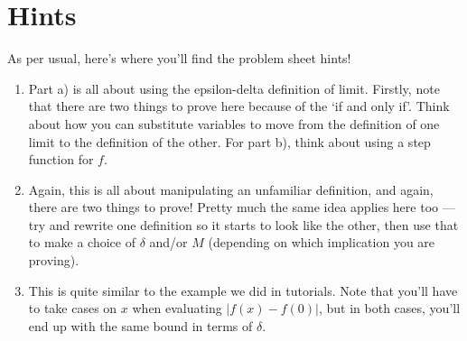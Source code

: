 \documentclass[
  10pt,
  a4paper]{article}
\providecommand{\tightlist}{%
  \setlength{\itemsep}{0pt}\setlength{\parskip}{0pt}}
\theoremstyle{plain}
\theoremstyle{definition}
\theoremstyle{plain}
\theoremstyle{plain}
\theoremstyle{plain}
\theoremstyle{plain}
\theoremstyle{definition}
\theoremstyle{definition}
\theoremstyle{remark}
\theoremstyle{remark}
\begin{document}
\hypertarget{hints}{%
\section{Hints}\label{hints}}

As per usual, here's where you'll find the problem sheet hints!

\begin{enumerate}
\def\labelenumi{\arabic{enumi})}
\tightlist
\item
  Part a) is all about using the epsilon-delta definition of limit. Firstly, note that there are two things to prove here because of the `if and only if'. Think about how you can substitute variables to move from the definition of one limit to the definition of the other. For part b), think about using a step function for \(f\).
\item
  Again, this is all about manipulating an unfamiliar definition, and again, there are two things to prove! Pretty much the same idea applies here too --- try and rewrite one definition so it starts to look like the other, then use that to make a choice of \(\delta\) and/or \(M\) (depending on which implication you are proving).
\item
  This is quite similar to the example we did in tutorials. Note that you'll have to take cases on \(x\) when evaluating \(\lvert f(x) - f(0)\rvert\), but in both cases, you'll end up with the same bound in terms of \(\delta\).
\end{enumerate}
\end{document}
